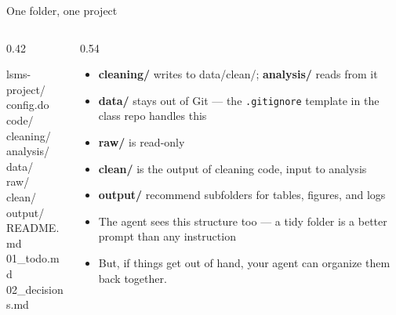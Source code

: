 \documentclass[aspectratio=169, 10pt]{beamer}
\begin{document}
\begin{frame}[fragile]{One folder, one project}

\begin{columns}[T]
\begin{column}{0.42\textwidth}
\begin{tcolorbox}[codebox]
\color{white}\footnotesize\ttfamily
lsms-project/\\
\hspace*{1em}config.do\\
\hspace*{1em}code/\\
\hspace*{2em}cleaning/\\
\hspace*{2em}analysis/\\
\hspace*{1em}data/\\
\hspace*{2em}raw/\\
\hspace*{2em}clean/\\
\hspace*{1em}output/\\
\hspace*{1em}README.md\\
\hspace*{1em}01\_todo.md\\
\hspace*{1em}02\_decisions.md
\end{tcolorbox}
\end{column}
\begin{column}{0.54\textwidth}
\begin{itemize}
  \item \textbf{cleaning/} writes to data/clean/; \textbf{analysis/} reads from it
  \item \textbf{data/} stays out of Git --- the \texttt{.gitignore} template in the class repo handles this
    \item \textbf{raw/} is read-only 
    \item \textbf{clean/} is the output of cleaning code, input to analysis
    \item \textbf{output/} recommend subfolders for tables, figures, and logs
  \item The agent sees this structure too --- a tidy folder is a better prompt than any instruction
  \item But, if things get out of hand, your agent can organize them back together.
\end{itemize}
\end{column}
\end{columns}

\end{frame}
\end{document}
